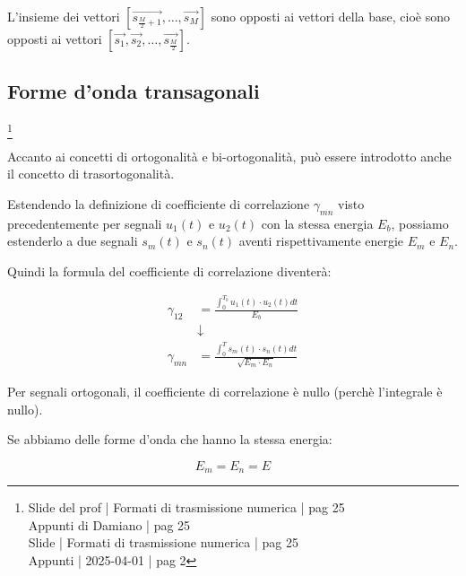L'insieme dei vettori $[\overrightarrow{s_{\frac{M}{2} + 1}}, \dots, \overrightarrow{s_{M}}]$ 
sono opposti ai vettori della base, 
cioè sono opposti ai vettori $[\overrightarrow{s_1}, \overrightarrow{s_2}, \dots, \overrightarrow{s_{\frac{M}{2}}} ]$. \newline 

\newpage 

\subsection{Forme d'onda transagonali}
\footnote{Slide del prof | Formati di trasmissione numerica | pag 25 \\  
Appunti di Damiano | pag 25 \\
Slide | Formati di trasmissione numerica | pag  25\\
Appunti | 2025-04-01 | pag 2
}

Accanto ai concetti di ortogonalità e bi-ortogonalità, 
può essere introdotto anche il concetto di trasortogonalità. \newline 

Estendendo la definizione di coefficiente di correlazione $\gamma_{mn}$ visto precedentemente per segnali $u_1 (t)$ e $u_2 (t)$ con la stessa energia $E_b$, 
possiamo estenderlo a due segnali $s_m (t)$ e $s_n (t)$ aventi rispettivamente energie $E_m$ e $E_n$. \newline 

Quindi la formula del coefficiente di correlazione diventerà:

{
    \Large 
    \begin{equation}
        \begin{split}
        \gamma_{12}
        &=
        \frac
        {
        \int_{0}^{T_b}
        u_1 (t) \cdot u_2 (t) dt 
        }{E_b}
        \\
        &\downarrow
        \\
        \gamma_{mn}
        &=
        \frac
        {
        \int_{0}^{T}
        s_m (t) \cdot s_n (t) dt 
        }{\sqrt{E_m \cdot E_n}}
        \end{split}
    \end{equation}
}

Per segnali ortogonali, 
il coefficiente di correlazione è nullo (perchè l'integrale è nullo). \newline 

Se abbiamo delle forme d'onda che hanno la stessa energia: 

{
    \Large 
    \begin{equation}
        E_m = E_n = E
    \end{equation}
}

